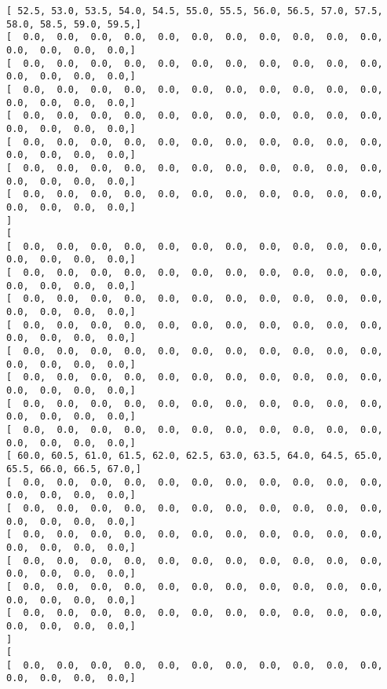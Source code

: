 \documentclass[11pt]{article}
\begin{document}
\begin{Verbatim}[commandchars=\\\{\}]
[  52.5,  53.0,  53.5,  54.0,  54.5,  55.0,  55.5,  56.0,  56.5,  57.0,  57.5,  58.0,  58.5,  59.0,  59.5, ]
[   0.0,   0.0,   0.0,   0.0,   0.0,   0.0,   0.0,   0.0,   0.0,   0.0,   0.0,   0.0,   0.0,   0.0,   0.0, ]
[   0.0,   0.0,   0.0,   0.0,   0.0,   0.0,   0.0,   0.0,   0.0,   0.0,   0.0,   0.0,   0.0,   0.0,   0.0, ]
[   0.0,   0.0,   0.0,   0.0,   0.0,   0.0,   0.0,   0.0,   0.0,   0.0,   0.0,   0.0,   0.0,   0.0,   0.0, ]
[   0.0,   0.0,   0.0,   0.0,   0.0,   0.0,   0.0,   0.0,   0.0,   0.0,   0.0,   0.0,   0.0,   0.0,   0.0, ]
[   0.0,   0.0,   0.0,   0.0,   0.0,   0.0,   0.0,   0.0,   0.0,   0.0,   0.0,   0.0,   0.0,   0.0,   0.0, ]
[   0.0,   0.0,   0.0,   0.0,   0.0,   0.0,   0.0,   0.0,   0.0,   0.0,   0.0,   0.0,   0.0,   0.0,   0.0, ]
[   0.0,   0.0,   0.0,   0.0,   0.0,   0.0,   0.0,   0.0,   0.0,   0.0,   0.0,   0.0,   0.0,   0.0,   0.0, ]
]
[
[   0.0,   0.0,   0.0,   0.0,   0.0,   0.0,   0.0,   0.0,   0.0,   0.0,   0.0,   0.0,   0.0,   0.0,   0.0, ]
[   0.0,   0.0,   0.0,   0.0,   0.0,   0.0,   0.0,   0.0,   0.0,   0.0,   0.0,   0.0,   0.0,   0.0,   0.0, ]
[   0.0,   0.0,   0.0,   0.0,   0.0,   0.0,   0.0,   0.0,   0.0,   0.0,   0.0,   0.0,   0.0,   0.0,   0.0, ]
[   0.0,   0.0,   0.0,   0.0,   0.0,   0.0,   0.0,   0.0,   0.0,   0.0,   0.0,   0.0,   0.0,   0.0,   0.0, ]
[   0.0,   0.0,   0.0,   0.0,   0.0,   0.0,   0.0,   0.0,   0.0,   0.0,   0.0,   0.0,   0.0,   0.0,   0.0, ]
[   0.0,   0.0,   0.0,   0.0,   0.0,   0.0,   0.0,   0.0,   0.0,   0.0,   0.0,   0.0,   0.0,   0.0,   0.0, ]
[   0.0,   0.0,   0.0,   0.0,   0.0,   0.0,   0.0,   0.0,   0.0,   0.0,   0.0,   0.0,   0.0,   0.0,   0.0, ]
[   0.0,   0.0,   0.0,   0.0,   0.0,   0.0,   0.0,   0.0,   0.0,   0.0,   0.0,   0.0,   0.0,   0.0,   0.0, ]
[  60.0,  60.5,  61.0,  61.5,  62.0,  62.5,  63.0,  63.5,  64.0,  64.5,  65.0,  65.5,  66.0,  66.5,  67.0, ]
[   0.0,   0.0,   0.0,   0.0,   0.0,   0.0,   0.0,   0.0,   0.0,   0.0,   0.0,   0.0,   0.0,   0.0,   0.0, ]
[   0.0,   0.0,   0.0,   0.0,   0.0,   0.0,   0.0,   0.0,   0.0,   0.0,   0.0,   0.0,   0.0,   0.0,   0.0, ]
[   0.0,   0.0,   0.0,   0.0,   0.0,   0.0,   0.0,   0.0,   0.0,   0.0,   0.0,   0.0,   0.0,   0.0,   0.0, ]
[   0.0,   0.0,   0.0,   0.0,   0.0,   0.0,   0.0,   0.0,   0.0,   0.0,   0.0,   0.0,   0.0,   0.0,   0.0, ]
[   0.0,   0.0,   0.0,   0.0,   0.0,   0.0,   0.0,   0.0,   0.0,   0.0,   0.0,   0.0,   0.0,   0.0,   0.0, ]
[   0.0,   0.0,   0.0,   0.0,   0.0,   0.0,   0.0,   0.0,   0.0,   0.0,   0.0,   0.0,   0.0,   0.0,   0.0, ]
]
[
[   0.0,   0.0,   0.0,   0.0,   0.0,   0.0,   0.0,   0.0,   0.0,   0.0,   0.0,   0.0,   0.0,   0.0,   0.0, ]

\end{Verbatim}
\end{document}
